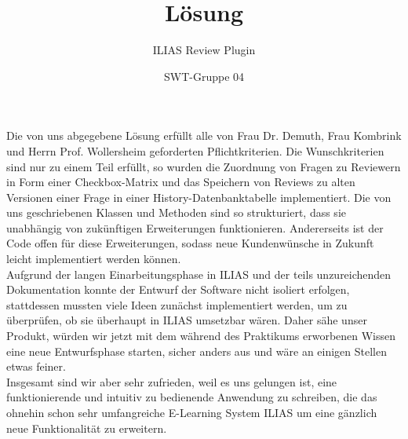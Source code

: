 \documentclass[a4paper]{scrreprt}
\begin{document}
 
\title{Lösung}
\subtitle{ILIAS Review Plugin}
\author{SWT-Gruppe 04}
\maketitle

\newpage

Die von uns abgegebene Lösung erfüllt alle von Frau Dr. Demuth, Frau Kombrink und Herrn Prof. Wollersheim geforderten Pflichtkriterien. Die Wunschkriterien sind nur zu einem Teil erfüllt, so wurden die Zuordnung von Fragen zu Reviewern in Form einer Checkbox-Matrix und das Speichern von Reviews zu alten Versionen einer Frage in einer History-Datenbanktabelle implementiert. Die von uns geschriebenen Klassen und Methoden sind so strukturiert, dass sie unabhängig von zukünftigen Erweiterungen funktionieren. Andererseits ist der Code offen für diese Erweiterungen, sodass neue Kundenwünsche in Zukunft leicht implementiert werden können.\\
Aufgrund der langen Einarbeitungsphase in ILIAS und der teils unzureichenden Dokumentation  konnte der Entwurf der Software nicht isoliert erfolgen, stattdessen mussten viele Ideen zunächst implementiert werden, um zu überprüfen, ob sie überhaupt in ILIAS umsetzbar wären. Daher sähe unser Produkt, würden wir jetzt mit dem während des Praktikums erworbenen Wissen eine neue Entwurfsphase starten, sicher anders aus und wäre an einigen Stellen etwas feiner.\\
Insgesamt sind wir aber sehr zufrieden, weil es uns gelungen ist, eine funktionierende und intuitiv zu bedienende Anwendung zu schreiben, die das ohnehin schon sehr umfangreiche E-Learning System ILIAS um eine gänzlich neue Funktionalität zu erweitern.
\end{document}
